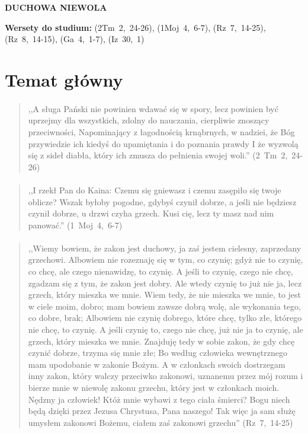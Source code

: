 \documentclass[10pt,a4paper,oneside]{article}
\begin{document}
\centerline{\textbf{\MakeUppercase{Duchowa niewola}}}
\begin{center}
\textbf{Wersety do studium:} 
\mbox{(2Tm 2, 24-26)}, \mbox{(1Moj 4, 6-7)}, \mbox{(Rz 7, 14-25)}, \mbox{(Rz 8, 14-15)}, \mbox{(Ga 4, 1-7)}, \mbox{(Iz 30, 1)}
\end{center}
\section{Temat główny}
\paragraph{}
\begin{quote}
,,A sługa Pański nie powinien wdawać się w spory, lecz powinien być uprzejmy dla wszystkich, zdolny do nauczania, cierpliwie znoszący przeciwności, Napominający z łagodnością krnąbrnych, w nadziei, że Bóg przywiedzie ich kiedyś do upamiętania i do poznania prawdy I że wyzwolą się z sideł diabła, który ich zmusza do pełnienia swojej woli.'' \mbox{(2 Tm 2, 24-26)}
\end{quote}
\paragraph{}
\begin{quote}
,,I rzekł Pan do Kaina: Czemu się gniewasz i czemu zasępiło się twoje oblicze? Wszak byłoby pogodne, gdybyś czynił dobrze, a jeśli nie będziesz czynił dobrze, u drzwi czyha grzech. Kusi cię, lecz ty masz nad nim panować.'' \mbox{(1 Moj 4, 6-7)}
\end{quote}
\paragraph{}
\begin{quote}
,,Wiemy bowiem, że zakon jest duchowy, ja zaś jestem cielesny, zaprzedany grzechowi. Albowiem nie rozeznaję się w tym, co czynię; gdyż nie to czynię, co chcę, ale czego nienawidzę, to czynię. A jeśli to czynię, czego nie chcę, zgadzam się z tym, że zakon jest dobry. Ale wtedy czynię to już nie ja, lecz grzech, który mieszka we mnie. Wiem tedy, że nie mieszka we mnie, to jest w ciele moim, dobro; mam bowiem zawsze dobrą wolę, ale wykonania tego, co dobre, brak; Albowiem nie czynię dobrego, które chcę, tylko złe, którego nie chcę, to czynię. A jeśli czynię to, czego nie chcę, już nie ja to czynię, ale grzech, który mieszka we mnie. Znajduję tedy w sobie zakon, że gdy chcę czynić dobrze, trzyma się mnie złe; Bo według człowieka wewnętrznego mam upodobanie w zakonie Bożym. A w członkach swoich dostrzegam inny zakon, który walczy przeciwko zakonowi, uznanemu przez mój rozum i bierze mnie w niewolę zakonu grzechu, który jest w członkach moich. Nędzny ja człowiek! Któż mnie wybawi z tego ciała śmierci? Bogu niech będą dzięki przez Jezusa Chrystusa, Pana naszego! Tak więc ja sam służę umysłem zakonowi Bożemu, ciałem zaś zakonowi grzechu'' \mbox{(Rz 7, 14-25)}
\end{quote}
\end{document}
